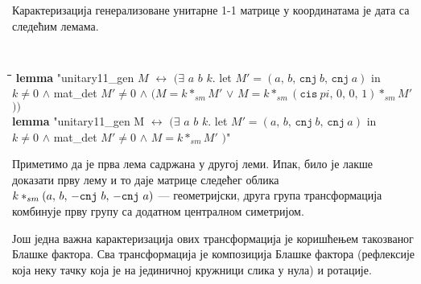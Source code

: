 Карактеризација генерализоване унитарне 1-1 матрице у координатама је
дата са следећим лемама.  {\tt
  \begin{tabbing}
    \hspace{5mm}\=\hspace{5mm}\=\hspace{5mm}\=\hspace{5mm}\=\hspace{5mm}\=\kill
{\bf lemma} "unitary11\_gen $M$ $\longleftrightarrow$ $($$\exists$ $a$ $b$ $k$. let $M' = (a,\,b,\,\mathtt{cnj}\ b,\,\mathtt{cnj}\ a)$ in \\
\> $k \neq 0$ $\wedge$ mat\_det $M' \neq 0$ $\wedge$ $(M = k *_{sm} M'$ $\vee$ $M = k *_{sm} (\mathtt{cis}\ pi,\,0,\,0,\,1) *_{sm} M'$$))$\\
{\bf lemma} "unitary11\_gen M $\longleftrightarrow$ $($$\exists$ $a$ $b$ $k$. let $M' = (a,\,b,\,\mathtt{cnj}\ b,\,\mathtt{cnj}\ a)$ in \\
\> $k \neq 0$ $\wedge$ mat\_det $M' \neq 0$ $\wedge$ $M = k *_{sm} M'$ $)$"
  \end{tabbing}
}
\noindent Приметимо да је прва лема садржана у другој леми. Ипак, било
је лакше доказати прву лему и то даје матрице следећег облика $k
*_{sm} (a,\,b,\,-{\tt cnj}\ b,\, -{\tt cnj}\ a)$ --- геометријски,
друга група трансформација комбинује прву групу са додатном централном
симетријом.

Још једна важна карактеризација ових трансформација је коришћењем
такозваног Блашке фактора. Сва трансформација је композиција Блашке
фактора (рефлексије која неку тачку која је на јединичној кружници
слика у нула) и ротације.

